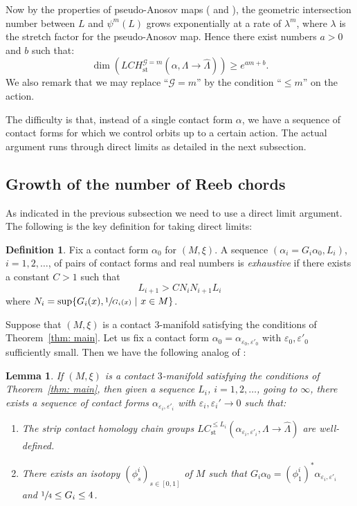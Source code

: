 \documentclass[10pt]{amsart}
\let\mathcal\mathscr
\let\ra\rightarrow
\newcommand{\st}{\mathrm{st}}
\theoremstyle{plain}
\newtheorem{lemma}[thm]{Lemma}
\theoremstyle{definition}
\newtheorem{defn}[thm]{Definition}
\numberwithin{equation}{subsection}
\newcommand{\be}{\begin{enumerate}}
\newcommand{\ee}{\end{enumerate}}
\begin{document}
Now by the properties of pseudo-Anosov maps (\cf \cite{FLP} and \cite[Th.\,14.24]{FM}), the geometric intersection number between $L$ and $\psi^m(L)$ grows exponentially at a rate of $\lambda^m$, where $\lambda$ is the stretch factor for the pseudo-Anosov map. Hence there exist numbers $a>0$ and $b$ such that:
\begin{equation} \label{eqn: exp growth}
\dim(LCH_{\st}^{\mathcal{G}=m}(\alpha,\Lambda\ra \widehat{\Lambda}))\geq e^{am+b}.
\end{equation}
We also remark that we may replace ``$\mathcal{G}=m$'' by the condition ``$\leq m$'' on the action.

The difficulty is that, instead of a single contact form $\alpha$, we have a sequence of contact forms for which we control orbits up to a certain action. The actual argument runs through direct limits as detailed in the next subsection.

\subsection{Growth of the number of Reeb chords}

As indicated in the previous subsection we need to use a direct limit argument. The following is the key definition for taking direct limits:

\begin{defn} \label{defn: exhaustive}
Fix a contact form $\alpha_0$ for $(M,\xi)$.
A sequence $(\alpha_i=G_i\alpha_0, L_i)$, $i=1,2,\dots$, of pairs of contact forms and real numbers is {\em exhaustive} if there exists a constant $C>1$ such that
\begin{equation} \label{eqn: exhaustive condition}
L_{i+1}> CN_i N_{i+1}L_i
\end{equation}
where $N_i=\sup \{ G_i(x), \sfrac{1}{G_i(x)}~|~ x\in M\}$.
\end{defn}

Suppose that $(M,\xi)$ is a contact $3$-manifold satisfying the conditions of Theorem~\ref{thm: main}.
Let us fix a contact form $\alpha_0=\alpha_{\varepsilon_0 ,\varepsilon'_0}$ with $\varepsilon_0,\varepsilon'_0$ sufficiently small. Then we have the following analog of \cite[Prop.\,10.2]{CH2}:

\begin{lemma} \label{lemma: sequence of contact forms}
If $(M,\xi)$ is a contact $3$-manifold satisfying the conditions of Theorem~\ref{thm: main}, then given a sequence $L_i$, $i=1,2,\dots$, going to $\infty$, there exists a sequence of contact forms $\alpha_{\varepsilon_i,\varepsilon'_i}$ with $\varepsilon_i,\varepsilon_i'\to 0$ such that:
\be
\item The strip contact homology chain groups $LC_{\st}^{\leq L_i}(\alpha_{\varepsilon_i,\varepsilon'_i}, \Lambda\ra \widehat\Lambda)$ are well-defined.
\item There exists an isotopy $(\phi^i_s)_{s\in[0,1]}$ of $M$ such that $G_i \alpha_0 = (\phi^i_1)^* \alpha_{\varepsilon_i,\varepsilon'_i}$
and $\sfrac{1}{4} \leq G_i \leq 4$.
\ee
\end{lemma}
\end{document}
